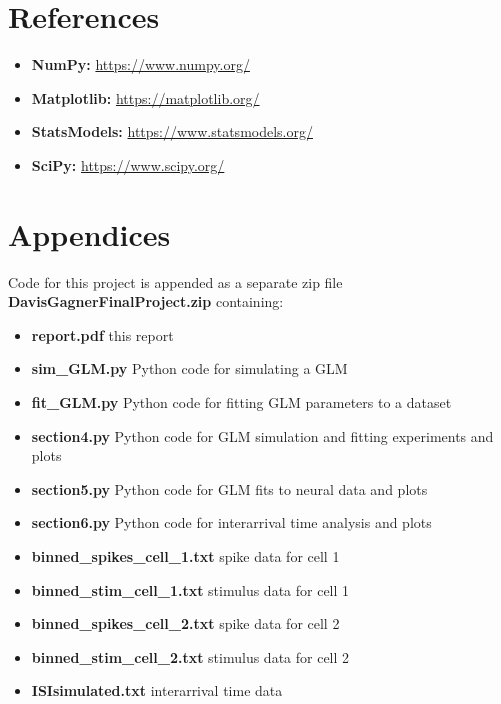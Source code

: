 \documentclass[letterpaper,titlepage,10pt]{article}
\begin{document}
\section{References}

\begin{itemize}
\item \textbf{NumPy:} \url{https://www.numpy.org/}
\item \textbf{Matplotlib:} \url{https://matplotlib.org/}
\item \textbf{StatsModels:} \url{https://www.statsmodels.org/}
\item \textbf{SciPy:} \url{https://www.scipy.org/}
\end{itemize}

\section{Appendices}

Code for this project is appended as a separate zip file \textbf{DavisGagnerFinalProject.zip} containing:

\begin{itemize}
\item \textbf{report.pdf} this report
\item \textbf{sim\_GLM.py} Python code for simulating a GLM
\item \textbf{fit\_GLM.py} Python code for fitting GLM parameters to a dataset
\item \textbf{section4.py} Python code for GLM simulation and fitting experiments and plots
\item \textbf{section5.py} Python code for GLM fits to neural data and plots
\item \textbf{section6.py} Python code for interarrival time analysis and plots
\item \textbf{binned\_spikes\_cell\_1.txt} spike data for cell 1
\item \textbf{binned\_stim\_cell\_1.txt} stimulus data for cell 1
\item \textbf{binned\_spikes\_cell\_2.txt} spike data for cell 2
\item \textbf{binned\_stim\_cell\_2.txt} stimulus data for cell 2
\item \textbf{ISIsimulated.txt} interarrival time data
\end{itemize}
\end{document}
